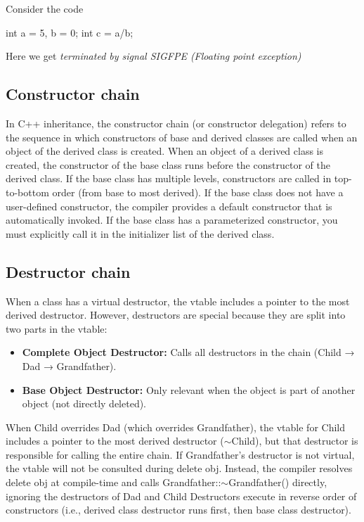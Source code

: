 \documentclass{report}
\begin{document}
    \pagebreak 
    \bigbreak \noindent 
    Consider the code
    \bigbreak \noindent 
    \begin{cppcode}
    int a = 5, b = 0;
    int c = a/b;
    \end{cppcode}
    \bigbreak \noindent 
    Here we get \textit{terminated by signal SIGFPE (Floating point exception)}



    \pagebreak 
    \bigbreak \noindent 
    \subsection{Constructor chain}
    \bigbreak \noindent 
    In C++ inheritance, the constructor chain (or constructor delegation) refers to the sequence in which constructors of base and derived classes are called when an object of the derived class is created.
    \bigbreak \noindent 
    When an object of a derived class is created, the constructor of the base class runs before the constructor of the derived class.
    \bigbreak \noindent 
    If the base class has multiple levels, constructors are called in top-to-bottom order (from base to most derived).
    \bigbreak \noindent 
    If the base class does not have a user-defined constructor, the compiler provides a default constructor that is automatically invoked.
    \bigbreak \noindent 
    If the base class has a parameterized constructor, you must explicitly call it in the initializer list of the derived class.
    \bigbreak \noindent 
    \subsection{Destructor chain}
    \bigbreak \noindent 
    When a class has a virtual destructor, the vtable includes a pointer to the most derived destructor. However, destructors are special because they are split into two parts in the vtable:
    \begin{itemize}
        \item \textbf{Complete Object Destructor:} Calls all destructors in the chain (Child → Dad → Grandfather).
        \item \textbf{Base Object Destructor:} Only relevant when the object is part of another object (not directly deleted).
    \end{itemize}
    \bigbreak \noindent 
    When Child overrides Dad (which overrides Grandfather), the vtable for Child includes a pointer to the most derived destructor ($\sim$Child), but that destructor is responsible for calling the entire chain.
    \bigbreak \noindent 
    If Grandfather's destructor is not virtual, the vtable will not be consulted during delete obj. Instead, the compiler resolves delete obj at compile-time and calls Grandfather::$\sim$Grandfather() directly, ignoring the destructors of Dad and Child
    \bigbreak \noindent 
    Destructors execute in reverse order of constructors (i.e., derived class destructor runs first, then base class destructor).
\end{document}
